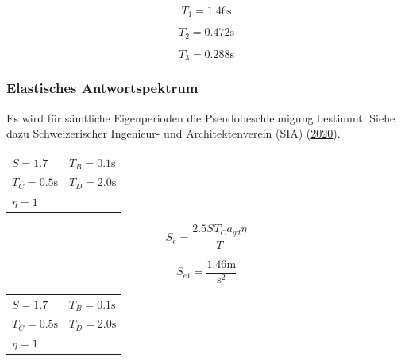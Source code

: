 \documentclass[
  letterpaper,
  DIV=11]{scrreprt}
\begin{document}
\begin{equation}T_{1} = 1.46 \text{s}\end{equation}

\begin{equation}T_{2} = 0.472 \text{s}\end{equation}

\begin{equation}T_{3} = 0.288 \text{s}\end{equation}

\hypertarget{elastisches-antwortspektrum-1}{%
\subsubsection{Elastisches
Antwortspektrum}\label{elastisches-antwortspektrum-1}}

Es wird für sämtliche Eigenperioden die Pseudobeschleunigung bestimmt.
Siehe dazu Schweizerischer Ingenieur- und Architektenverein (SIA)
(\protect\hyperlink{ref-SIA261_2020}{2020}).

\begin{longtable}[]{@{}
  >{\raggedright\arraybackslash}p{}
  >{\raggedright\arraybackslash}p{}@{}}
\toprule\noalign{}
\endhead
\bottomrule\noalign{}
\endlastfoot
\(S = 1.7\) & \(T_{B} = 0.1 \text{s}\) \\
\(T_{C} = 0.5 \text{s}\) & \(T_{D} = 2.0 \text{s}\) \\
\(\eta = 1\) & \\
\end{longtable}

\begin{equation}S_{e} = \frac{2.5 S_{} T_{C} a_{gd} \eta}{T}\end{equation}

\begin{equation}S_{e 1} = \frac{1.46 \text{m}}{\text{s}^{2}}\end{equation}

\begin{longtable}[]{@{}
  >{\raggedright\arraybackslash}p{}
  >{\raggedright\arraybackslash}p{}@{}}
\toprule\noalign{}
\endhead
\bottomrule\noalign{}
\endlastfoot
\(S = 1.7\) & \(T_{B} = 0.1 \text{s}\) \\
\(T_{C} = 0.5 \text{s}\) & \(T_{D} = 2.0 \text{s}\) \\
\(\eta = 1\) & \\
\end{longtable}
\end{document}
